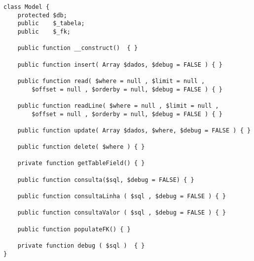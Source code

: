 \begin{lstlisting}
class Model {
    protected $db;
    public    $_tabela;
    public    $_fk;

    public function __construct()  { }

    public function insert( Array $dados, $debug = FALSE ) { }

    public function read( $where = null , $limit = null ,
        $offset = null , $orderby = null, $debug = FALSE ) { }

    public function readLine( $where = null , $limit = null ,
        $offset = null , $orderby = null, $debug = FALSE ) { }

    public function update( Array $dados, $where, $debug = FALSE ) { }

    public function delete( $where ) { }

    private function getTableField() { }

    public function consulta($sql, $debug = FALSE) { }

    public function consultaLinha ( $sql , $debug = FALSE ) { }

    public function consultaValor ( $sql , $debug = FALSE ) { }

    public function populateFK() { }

    private function debug ( $sql )  { }
}
\end{lstlisting}

